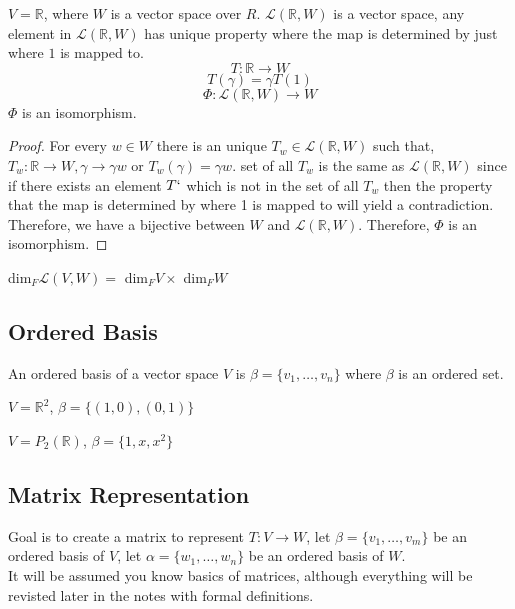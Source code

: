 \documentclass[11pt,a4paper]{colorart}
\def\l{\left}
\def\r{\right}
\def\R{\mathbb{R}}
\def\a{\alpha}
\def\b{\beta}
\def\g{\gamma}
\def\L{\mathcal{L}}
\begin{document}
\begin{example}
	$V = \R$, where $W$ is a vector space over $R$. $\L\l(\R,W\r)$ is a vector space, any element in $\L\l(\R,W\r)$ has unique property where the map is determined by just where $1$ is mapped to. 
	\[T:\R\rightarrow W\]
	\[T\l(\g\r) = \g T\l(1\r) \]
	\[ \Phi: \L\l(\R,W\r) \rightarrow W \]
	$\Phi$ is an isomorphism.
	\begin{proof}
		For every $w\in W$ there is an unique $T_w\in\L\l(\R,W\r)$ such that, $T_w:\R\rightarrow W, \g\rightarrow\g w$ or $T_w\l(\g\r)=\g w$. set of all $T_w$ is the same as $\L\l(\R,W\r)$ since if there exists an element $T`$ which is not in the set of all $T_w$ then the property that the map is determined by where 1 is mapped to will yield a contradiction. Therefore, we have a bijective between $W$ and $\L\l(\R,W\r)$. Therefore, $\Phi$ is an isomorphism.
	\end{proof}
\end{example}

\begin{conjecture}
	dim$_F\L\l(V,W\r) =$ dim$_FV\times$ dim$_FW$
\end{conjecture}

\subsection{Ordered Basis}

\begin{definition}
	An ordered basis of a vector space $V$ is $\b = \{v_1,\dots,v_n\}$ where $\b$ is an ordered set.
\end{definition}

\begin{example}
	$V=\R^2$, $\b =\{ \l(1,0\r),\l(0,1\r)\}$
\end{example}

\begin{example}
	$V=P_2\l(\R\r)$, $\b =\{1,x,x^2\}$
\end{example}

\subsection{Matrix Representation}

Goal is to create a matrix to represent $T:V\rightarrow W$, let $\b=\{v_1,\dots,v_m\}$ be an ordered basis of $V$, let $\a=\{w_1,\dots,w_n\}$ be an ordered basis of $W$.\\

It will be assumed you know basics of matrices, although everything will be revisted later in the notes with formal definitions.
\end{document}
